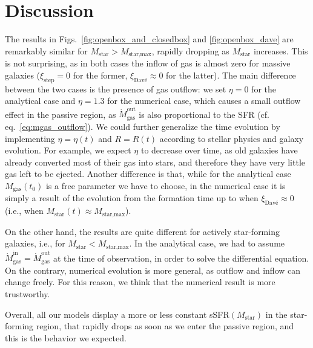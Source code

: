 \documentclass[fleqn,usenatbib]{mnras}
\begin{document}
\section{Discussion}\label{sec:discussion}
The results in Figs.~\ref{fig:openbox_and_closedbox} and \ref{fig:openbox_dave} are remarkably similar for $M_\text{star}>M_\text{star,max}$, rapidly dropping as $M_\text{star}$ increases. This is not surprising, as in both cases the inflow of gas is almost zero for massive galaxies ($\xi_\text{step}=0$ for the former, $\xi_\text{Davé}\approx0$ for the latter). 
The main difference between the two cases is the presence of gas outflow: we set $\eta=0$ for the analytical case and $\eta=1.3$ for the numerical case, which causes a small outflow effect in the passive region, as $\dot{M}_\text{gas}^\text{out}$ is also proportional to the SFR (cf. eq.~\ref{eq:mgas_outflow}). We could further generalize the time evolution by implementing $\eta=\eta(t)$ and $R=R(t)$ according to stellar physics and galaxy evolution. For example, we expect $\eta$ to decrease over time, as old galaxies have already converted most of their gas into stars, and therefore they have very little gas left to be ejected.
Another difference is that, while for the analytical case $M_\text{gas}(t_0)$ is a free parameter we have to choose, in the numerical case it is simply a result of the evolution from the formation time up to when $\xi_\text{Davé}\approx0$ (i.e., when $M_\text{star}(t)\approx M_{\text{star,max}}$).

On the other hand, the results are quite different for actively star-forming galaxies, i.e., for $M_\text{star}<M_\text{star,max}$. In the analytical case, we had to assume $\dot{M}_\text{gas}^\text{in}=\dot{M}_\text{gas}^\text{out}$ at the time of observation, in order to solve the differential equation. On the contrary, numerical evolution is more general, as outflow and inflow can change freely. For this reason, we think that the numerical result is more trustworthy.

Overall, all our models display a more or less constant sSFR$(M_\text{star})$ in the star-forming region, that rapidly drops as soon as we enter the passive region, and this is the behavior we expected.
\end{document}
